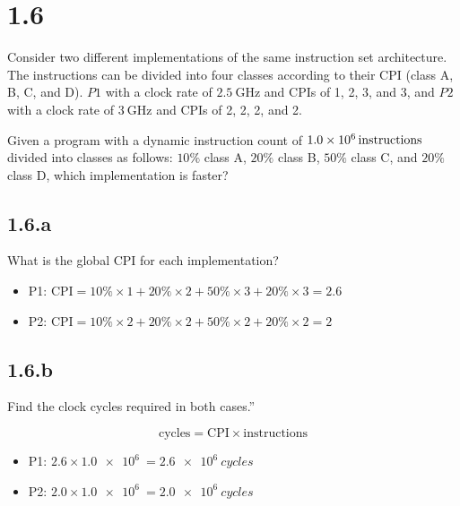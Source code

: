 \documentclass[paper=a4, fontsize=11pt]{scrartcl} %
\begin{document}
\pagebreak

\section{1.6}

\begin{fancyquotes}
  Consider two different implementations of the same instruction set
  architecture. The instructions can be divided into four classes
  according to their CPI (class A, B, C, and D). $P1$ with a clock rate
  of $\SI{2.5}{\giga\hertz}$ and CPIs of 1, 2, 3, and 3, and $P2$ with
  a clock rate of $\SI{3}{\giga\hertz}$ and CPIs of 2, 2, 2, and 2.

  Given a program with a dynamic instruction count of
  $\SI{1.0E6}{instructions}$ divided into classes as follows: $10\%$
  class A, $20\%$ class B, $50\%$ class C, and $20\%$ class D, which
  implementation is faster?
\end{fancyquotes}

\subsection{1.6.a}
\begin{fancyquotes}
  What is the global CPI for each implementation?
\end{fancyquotes}

\begin{itemize}
\item{P1:} $\text{CPI} = 10\%\times 1 + 20\%\times 2 + 50\%\times 3
  + 20\%\times 3 = 2.6$
\item{P2:} $\text{CPI} = 10\%\times 2 + 20\%\times 2 + 50\%\times 2
  + 20\%\times 2 = 2$
\end{itemize}

\subsection{1.6.b}
\begin{fancyquotes}
  Find the clock cycles required in both cases.”
\end{fancyquotes}

$$\text{cycles} = \text{CPI}\times\text{instructions}$$

\begin{itemize}
\item{P1:} $2.6\times\SI{1.0e6}{} = \SI{2.6e6}{cycles}$
\item{P2:} $2.0\times\SI{1.0e6}{} = \SI{2.0e6}{cycles}$
\end{itemize}
\end{document}

